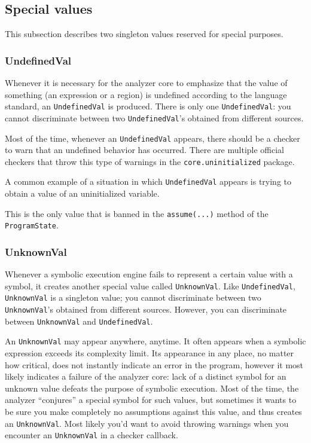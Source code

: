 \documentclass[a4paper,12pt]{article}
\begin{document}
\subsection{Special values}

This subsection describes two singleton values reserved for special purposes.

\subsubsection{UndefinedVal}

Whenever it is necessary for the analyzer core to emphasize that the value of something (an expression or a region) is undefined according to the language standard, an \lstinline|UndefinedVal| is produced. There is only one \lstinline|UndefinedVal|: you cannot discriminate between two \lstinline|UndefinedVal|'s obtained from different sources.

Most of the time, whenever an \lstinline|UndefinedVal| appears, there should be a checker to warn that an undefined behavior has occurred. There are multiple official checkers that throw this type of warnings in the \lstinline|core.uninitialized| package.

A common example of a situation in which \lstinline|UndefinedVal| appears is trying to obtain a value of an uninitialized variable.

This is the only value that is banned in the \lstinline|assume(...)| method of the \lstinline|ProgramState|.

\subsubsection{UnknownVal}

Whenever a symbolic execution engine fails to represent a certain value with a symbol, it creates another special value called \lstinline|UnknownVal|. Like \lstinline|UndefinedVal|, \lstinline|UnknownVal| is a singleton value; you cannot discriminate between two \lstinline|UnknownVal|'s obtained from different sources. However, you can discriminate between \lstinline|UnknownVal| and \lstinline|UndefinedVal|.

An \lstinline|UnknownVal| may appear anywhere, anytime. It often appears when a symbolic expression exceeds its complexity limit. Its appearance in any place, no matter how critical, does not instantly indicate an error in the program, however it most likely indicates a failure of the analyzer core: lack of a distinct symbol for an unknown value defeats the purpose of symbolic execution. Most of the time, the analyzer ``conjures'' a special symbol for such values, but sometimes it wants to be sure you make completely no assumptions against this value, and thus creates an \lstinline|UnknownVal|. Most likely you'd want to avoid throwing warnings when you encounter an \lstinline|UnknownVal| in a checker callback.
\end{document}
